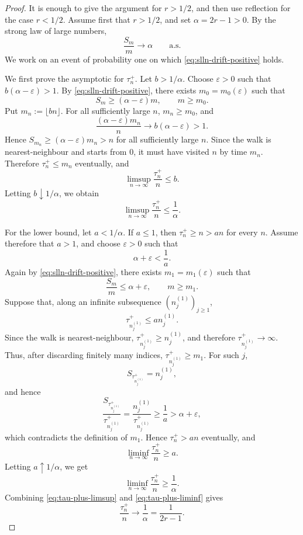 \documentclass[reqno,final,11pt]{amsart}
\theoremstyle{plain}
\theoremstyle{definition}
\theoremstyle{remark}
\numberwithin{equation}{section}
\begin{document}
\begin{proof}
It is enough to give the argument for \(r>1/2\), and then use reflection for
the case \(r<1/2\). Assume first that \(r>1/2\), and set \(  \alpha=2r-1>0\). By the strong law of large numbers,
\begin{equation}\label{eq:slln-drift-positive}
  \frac{S_m}{m}\longrightarrow \alpha
  \qquad\text{a.s.}
\end{equation}
We work on an event of probability one on which \eqref{eq:slln-drift-positive}
holds.

We first prove the asymptotic for \(\tau_n^+\). Let \(b>1/\alpha\). Choose
\(\varepsilon>0\) such that \(b(\alpha-\varepsilon)>1\). By
\eqref{eq:slln-drift-positive}, there exists \(m_0=m_0(\varepsilon)\) such that
\[
  S_m\ge (\alpha-\varepsilon)m,
  \qquad m\ge m_0 .
\]
Put \(m_n:=\lfloor bn\rfloor\). For all sufficiently large \(n\),
\(m_n\ge m_0\), and
\[
  \frac{(\alpha-\varepsilon)m_n}{n}
  \longrightarrow
  b(\alpha-\varepsilon)>1.
\]
Hence \(S_{m_n}\ge(\alpha-\varepsilon)m_n>n\) for all sufficiently large \(n\).
Since the walk is nearest-neighbour and starts from \(0\), it must have visited
\(n\) by time \(m_n\). Therefore \(\tau_n^+\le m_n\) eventually, and
\[
  \limsup_{n\to\infty}\frac{\tau_n^+}{n}\le b.
\]
Letting \(b\downarrow1/\alpha\), we obtain
\begin{equation}\label{eq:tau-plus-limsup}
  \limsup_{n\to\infty}\frac{\tau_n^+}{n}
  \le
  \frac1\alpha .
\end{equation}

For the lower bound, let \(a<1/\alpha\). If \(a\le1\), then
\(\tau_n^+\ge n>an\) for every \(n\). Assume therefore that \(a>1\), and choose
\(\varepsilon>0\) such that
\[
  \alpha+\varepsilon<\frac1a.
\]
Again by \eqref{eq:slln-drift-positive}, there exists
\(m_1=m_1(\varepsilon)\) such that
\[
  \frac{S_m}{m}\le \alpha+\varepsilon,
  \qquad m\ge m_1 .
\]
Suppose that, along an infinite subsequence \((n_j^{(1)})_{j\ge1}\),
\[
  \tau_{n_j^{(1)}}^+\le a n_j^{(1)} .
\]
Since the walk is nearest-neighbour, \(\tau_{n_j^{(1)}}^+\ge n_j^{(1)}\), and
therefore \(\tau_{n_j^{(1)}}^+\to\infty\). Thus, after discarding finitely many
indices, \(\tau_{n_j^{(1)}}^+\ge m_1\). For such \(j\),
\[
  S_{\tau_{n_j^{(1)}}^+}=n_j^{(1)},
\]
and hence
\[
  \frac{S_{\tau_{n_j^{(1)}}^+}}{\tau_{n_j^{(1)}}^+}
  =
  \frac{n_j^{(1)}}{\tau_{n_j^{(1)}}^+}
  \ge
  \frac1a
  >
  \alpha+\varepsilon,
\]
which contradicts the definition of \(m_1\). Hence \(\tau_n^+>an\) eventually,
and
\[
  \liminf_{n\to\infty}\frac{\tau_n^+}{n}\ge a.
\]
Letting \(a\uparrow1/\alpha\), we get
\begin{equation}\label{eq:tau-plus-liminf}
  \liminf_{n\to\infty}\frac{\tau_n^+}{n}
  \ge
  \frac1\alpha .
\end{equation}
Combining \eqref{eq:tau-plus-limsup} and \eqref{eq:tau-plus-liminf} gives
\[
  \frac{\tau_n^+}{n}
  \longrightarrow
  \frac1\alpha
  =
  \frac1{2r-1}.
\]


\end{proof}
\end{document}
